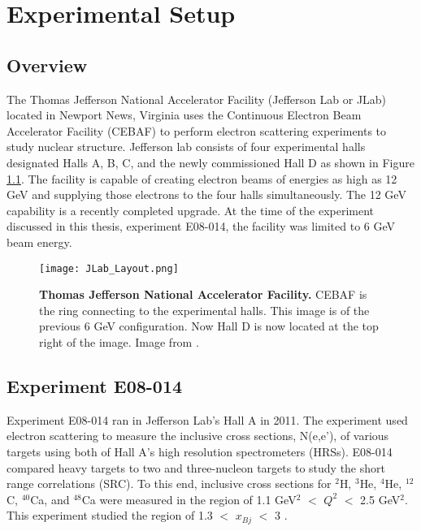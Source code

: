 \chapter{Experimental Setup} %
\label{ch:experiment} %

\section{Overview}
\label{sec:overview}

The Thomas Jefferson National Accelerator Facility (Jefferson Lab or JLab) located in Newport News, Virginia uses the Continuous Electron Beam Accelerator Facility (CEBAF) to perform electron scattering experiments to study nuclear structure. Jefferson lab consists of four experimental halls designated Halls A, B, C, and the newly commissioned Hall D as shown in Figure \ref{fig:jlab}. The facility is capable of creating electron beams of energies as high as 12 GeV and supplying those electrons to the four halls simultaneously. The 12 GeV capability is a recently completed upgrade. At the time of the experiment discussed in this thesis, experiment E08-014, the facility was limited to 6 GeV beam energy.  

\begin{figure}[!ht]
\begin{center}
\texttt{[image: JLab\_Layout.png]}
\end{center}
\caption[Thomas Jefferson National Accelerator Facility]{
{\bf{Thomas Jefferson National Accelerator Facility.}} CEBAF is the ring connecting to the experimental halls. This image is of the previous 6 GeV configuration. Now Hall D is now located at the top right of the image. Image from \cite{Article:HallA}.}
\label{fig:jlab}
\end{figure}

\section{Experiment E08-014}
\label{sec:x>2}
Experiment E08-014 ran in Jefferson Lab's Hall A in 2011. The experiment used electron scattering to measure the inclusive cross sections, N(e,e'), of various targets using both of Hall A's high resolution spectrometers (HRSs). E08-014 compared heavy targets to two and three-nucleon targets to study the short range correlations (SRC). To this end, inclusive cross sections for $^2$H, $^3$He, $^4$He, $^{12}$C, $^{40}$Ca, and $^{48}$Ca were measured in the region of 1.1 GeV$^2$ $<$ $Q^2$ $<$ 2.5 GeV$^2$. This experiment studied the region of 1.3 $<$ $x_{Bj}$ $<$ 3 \cite{Thesis:Ye} \cite{src_website}. 


